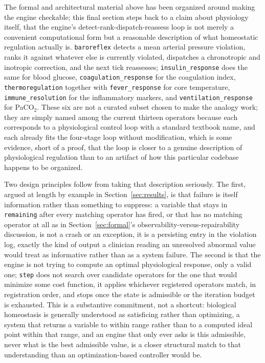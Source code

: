 \documentclass[11pt]{article}
\begin{document}
The formal and architectural material above has been organized around making the engine checkable; this final section steps back to a claim about physiology itself, that the engine's detect-rank-dispatch-reassess loop is not merely a convenient computational form but a reasonable description of what homeostatic regulation actually is. \texttt{baroreflex} detects a mean arterial pressure violation, ranks it against whatever else is currently violated, dispatches a chronotropic and inotropic correction, and the next tick reassesses; \texttt{insulin\_response} does the same for blood glucose, \texttt{coagulation\_response} for the coagulation index, \texttt{thermoregulation} together with \texttt{fever\_response} for core temperature, \texttt{immune\_resolution} for the inflammatory markers, and \texttt{ventilation\_response} for PaCO$_2$. These six are not a curated subset chosen to make the analogy work; they are simply named among the current thirteen operators because each corresponds to a physiological control loop with a standard textbook name, and each already fits the four-stage loop without modification, which is some evidence, short of a proof, that the loop is closer to a genuine description of physiological regulation than to an artifact of how this particular codebase happens to be organized.

Two design principles follow from taking that description seriously. The first, argued at length by example in Section~\ref{sec:results}, is that failure is itself information rather than something to suppress: a variable that stays in \texttt{remaining} after every matching operator has fired, or that has no matching operator at all as in Section~\ref{sec:formal}'s observability-versus-repairability discussion, is not a crash or an exception, it is a persisting entry in the violation log, exactly the kind of output a clinician reading an unresolved abnormal value would treat as informative rather than as a system failure. The second is that the engine is not trying to compute an optimal physiological response, only a valid one; \texttt{step} does not search over candidate operators for the one that would minimize some cost function, it applies whichever registered operators match, in registration order, and stops once the state is admissible or the iteration budget is exhausted. This is a substantive commitment, not a shortcut: biological homeostasis is generally understood as satisficing rather than optimizing, a system that returns a variable to within range rather than to a computed ideal point within that range, and an engine that only ever asks is this admissible, never what is the best admissible value, is a closer structural match to that understanding than an optimization-based controller would be.
\end{document}
